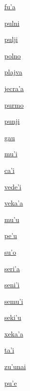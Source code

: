 {\hyperlink{val:fuha}{fu'a}}{}{}{}

{\hyperlink{val:pulni}{pulni}}{}{}{}

{\hyperlink{val:pulji}{pulji}}{}{}{}

{\hyperlink{val:polno}{polno}}{}{}{}

{\hyperlink{val:plajva}{plajva}}{}{}{}

{\hyperlink{val:jecraha}{jecra'a}}{}{}{}

{\hyperlink{val:purmo}{purmo}}{}{}{}

{\hyperlink{val:punji}{punji}}{}{}{}

{\hyperlink{val:gau}{gau}}{}{}{}

{\hyperlink{val:muhi}{mu'i}}{}{}{}

{\hyperlink{val:cahi}{ca'i}}{}{}{}

{\hyperlink{val:vedehi}{vede'i}}{}{}{}

{\hyperlink{val:vekaha}{veka'a}}{}{}{}

{\hyperlink{val:muhu}{mu'u}}{}{}{}

{\hyperlink{val:pehu}{pe'u}}{}{}{}

{\hyperlink{val:suho}{su'o}}{}{}{}

{\hyperlink{val:seriha}{seri'a}}{}{}{}

{\hyperlink{val:senihi}{seni'i}}{}{}{}

{\hyperlink{val:semuhi}{semu'i}}{}{}{}

{\hyperlink{val:sekihu}{seki'u}}{}{}{}

{\hyperlink{val:xekaha}{xeka'a}}{}{}{}

{\hyperlink{val:tahi}{ta'i}}{}{}{}

{\hyperlink{val:zuhunai}{zu'unai}}{}{}{}

{\hyperlink{val:puhe}{pu'e}}{}{}{}

